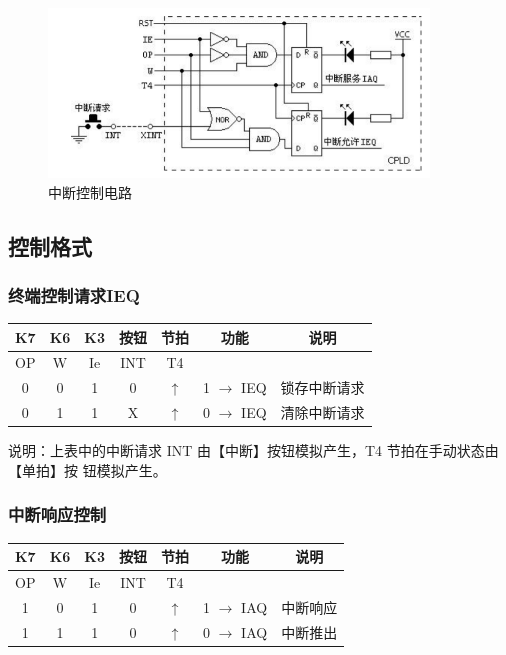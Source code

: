 \documentclass[a4paper,10pt,UTF8]{paper}
\numberwithin{equation}{section}
\numberwithin{figure}{section}
\begin{document}
\begin{figure}[h]
	\centering
	\includegraphics[width=0.9\textwidth]{2.PNG}
	\caption{中断控制电路}
	\label{fig:2}
\end{figure}

\subsection{控制格式}

\subsubsection{终端控制请求IEQ}

\begin{center}
	\begin{tabular}{|c|c|c|c|c|c|c|}
		\hline
		K7 & K6 & K3 & 按钮 & 节拍     & 功能              & 说明             \\ \hline
		OP & W  & Ie & INT    & T4         &                     &                    \\ \hline
		0  & 0  & 1  & 0      & $\uparrow$ & 1 $\rightarrow$ IEQ & 锁存中断请求 \\ \hline
		0  & 1  & 1  & X      & $\uparrow$ & 0 $\rightarrow$ IEQ & 清除中断请求 \\ \hline
		  
	\end{tabular}
\end{center}

说明：上表中的中断请求 INT 由【中断】按钮模拟产生，T4 节拍在手动状态由【单拍】按
钮模拟产生。

\subsubsection{中断响应控制}

\begin{center}
	\begin{tabular}{|c|c|c|c|c|c|c|}
		\hline
		K7 & K6 & K3 & 按钮 & 节拍     & 功能              & 说明       \\ \hline
		OP & W  & Ie & INT    & T4         &                     &              \\ \hline
		1  & 0  & 1  & 0      & $\uparrow$ & 1 $\rightarrow$ IAQ & 中断响应 \\ \hline
		1  & 1  & 1  & 0      & $\uparrow$ & 0 $\rightarrow$ IAQ & 中断推出 \\ \hline
	\end{tabular}  
\end{center}
\end{document}
